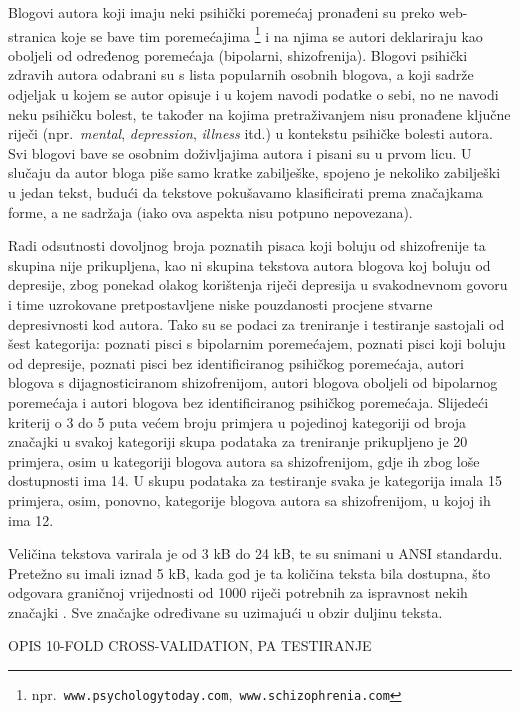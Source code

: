 \documentclass[10pt, a4paper]{article}
\begin{document}
Blogovi autora koji imaju neki psihički poremećaj pronađeni su preko web-stranica koje se bave tim poremećajima \footnote{npr.~\texttt{www.psychologytoday.com},\texttt{ www.schizophrenia.com}} i na njima se autori deklariraju kao oboljeli od određenog poremećaja (bipolarni, shizofrenija). Blogovi psihički zdravih autora odabrani su s lista popularnih osobnih blogova, a koji sadrže odjeljak u kojem se autor opisuje i u kojem navodi podatke o sebi, no ne navodi neku psihičku bolest, te također na kojima pretraživanjem nisu pronađene ključne riječi (npr.~\emph{mental}, \emph{depression}, \emph{illness} itd.) u kontekstu psihičke bolesti autora. Svi blogovi bave se osobnim doživljajima autora i pisani su u prvom licu. U slučaju da autor bloga piše samo kratke zabilješke, spojeno je nekoliko zabilješki u jedan tekst, budući da tekstove pokušavamo klasificirati prema značajkama forme, a ne sadržaja (iako ova aspekta nisu potpuno nepovezana).

Radi odsutnosti dovoljnog broja poznatih pisaca koji boluju od shizofrenije ta skupina nije prikupljena, kao ni skupina tekstova autora blogova koj boluju od depresije, zbog ponekad olakog korištenja riječi depresija u svakodnevnom govoru i time uzrokovane pretpostavljene niske pouzdanosti procjene stvarne depresivnosti kod autora. Tako su se podaci za treniranje i testiranje sastojali od šest kategorija: poznati pisci s bipolarnim poremećajem, poznati pisci koji boluju od depresije, poznati pisci bez identificiranog psihičkog poremećaja, autori blogova s dijagnosticiranom shizofrenijom, autori blogova oboljeli od bipolarnog poremećaja i autori blogova bez identificiranog psihičkog poremećaja. Slijedeći kriterij o 3 do 5 puta većem broju primjera u pojedinoj kategoriji od broja značajki \citep{ribaric} u svakoj kategoriji skupa podataka za treniranje prikupljeno je 20 primjera, osim u kategoriji blogova autora sa shizofrenijom, gdje ih zbog loše dostupnosti ima 14. U skupu podataka za testiranje svaka je kategorija imala 15 primjera, osim, ponovno, kategorije blogova autora sa shizofrenijom, u kojoj ih ima 12. 

Veličina tekstova varirala je od 3 kB do 24 kB, te su snimani u ANSI standardu. Pretežno su imali iznad 5 kB, kada god je ta količina teksta bila dostupna, što odgovara graničnoj vrijednosti od 1000 riječi potrebnih za ispravnost nekih značajki  \citep{tweedie}. Sve značajke određivane su uzimajući u obzir duljinu teksta. 

OPIS 10-FOLD CROSS-VALIDATION, PA TESTIRANJE
\end{document}
